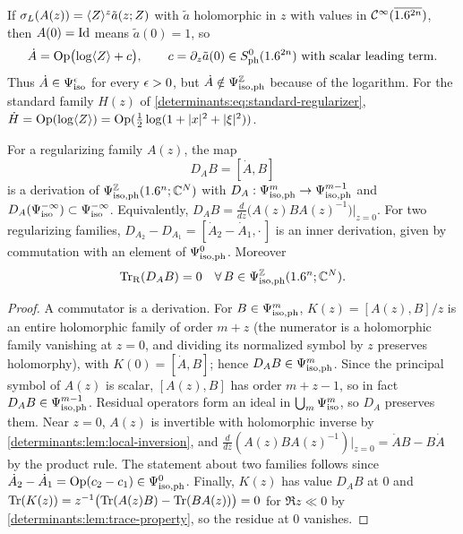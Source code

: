 If $\sigma_L(A(z))=\langle Z\rangle^z\tilde a(z;Z)$ with $\tilde a$ holomorphic in $z$
with values in $\mathcal{C}^\infty(\overline{1.6^{2n}})$, then $A(0)=\operatorname{Id}$ means $\tilde a(0)=1$, so
\begin{equation*}
  \dot A=\operatorname{Op}\bigl(\log\langle Z\rangle+c\bigr),\qquad c=\partial_z\tilde a(0)\in S^{0}_{\mathrm{ph}}(1.6^{2n})\text{ with scalar leading term.}
\end{equation*}
Thus $\dot A\in\Psi^{\epsilon}_{\mathrm{iso}}$ for every $\epsilon>0$, but $\dot A\notin\Psi^{\mathbb{Z}}_{\mathrm{iso,ph}}$
because of the logarithm. For the standard family $H(z)$ of
\eqref{determinants:eq:standard-regularizer}, $\dot H=\operatorname{Op}(\log\langle Z\rangle)=\operatorname{Op}(\tfrac12\log(1+\lvert x\rvert^2+\lvert \xi\rvert^2))$.

\begin{proposition}\label{determinants:prop:derivation}
  For a regularizing family $A(z)$, the map
  \begin{equation*}
    D_AB=[\dot A,B]
  \end{equation*}
  is a derivation of $\Psi^{\mathbb{Z}}_{\mathrm{iso,ph}}(1.6^n;\mathbb{C}^N)$ with
  $D_A:\Psi^{m}_{\mathrm{iso,ph}}\to\Psi^{m-1}_{\mathrm{iso,ph}}$ and $D_A(\Psi^{-\infty}_{\mathrm{iso}})\subset\Psi^{-\infty}_{\mathrm{iso}}$.
  Equivalently, $D_AB=\frac{d}{dz}\bigl(A(z)BA(z)^{-1}\bigr)\big|_{z=0}$. For two
  regularizing families, $D_{A_2}-D_{A_1}=[\dot A_2-\dot A_1,\cdot\,]$ is an
  inner derivation, given by commutation with an element of $\Psi^{0}_{\mathrm{iso,ph}}$.
  Moreover
  \begin{equation}\label{determinants:eq:res-derivation}
    \operatorname{Tr}_{\mathrm{R}}(D_AB)=0\quad\forall\,B\in\Psi^{\mathbb{Z}}_{\mathrm{iso,ph}}(1.6^n;\mathbb{C}^N).
  \end{equation}
\end{proposition}
\begin{proof}
  A commutator is a derivation. For $B\in\Psi^{m}_{\mathrm{iso,ph}}$, $K(z)=[A(z),B]/z$ is an
  entire holomorphic family of order $m+z$ (the numerator is a holomorphic
  family vanishing at $z=0$, and dividing its normalized symbol by $z$
  preserves holomorphy), with $K(0)=[\dot A,B]$; hence $D_AB\in\Psi^{m}_{\mathrm{iso,ph}}$.
  Since the principal symbol of $A(z)$ is scalar, $[A(z),B]$ has order
  $m+z-1$, so in fact $D_AB\in\Psi^{m-1}_{\mathrm{iso,ph}}$. Residual operators form an ideal
  in $\bigcup_m\Psi^{m}_{\mathrm{iso}}$, so $D_A$ preserves them. Near $z=0$, $A(z)$ is invertible
  with holomorphic inverse by \cref{determinants:lem:local-inversion}, and
  $\frac{d}{dz}(A(z)BA(z)^{-1})|_{z=0}=\dot AB-B\dot A$ by the product rule.
  The statement about two families follows since
  $\dot A_2-\dot A_1=\operatorname{Op}(c_2-c_1)\in\Psi^{0}_{\mathrm{iso,ph}}$. Finally, $K(z)$ has value
  $D_AB$ at $0$ and $\operatorname{Tr}(K(z))=z^{-1}\bigl(\operatorname{Tr}(A(z)B)-\operatorname{Tr}(BA(z))\bigr)=0$ for
  $\Re z\ll0$ by \cref{determinants:lem:trace-property}, so the residue at
  $0$ vanishes.
\end{proof}

